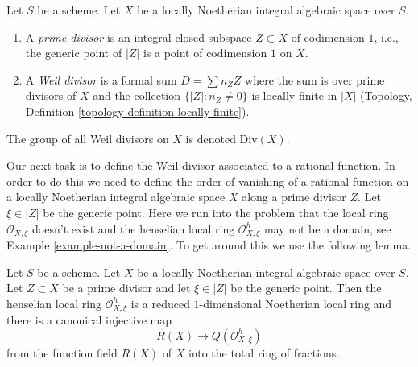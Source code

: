\begin{definition}
\label{definition-Weil-divisor}
Let $S$ be a scheme.
Let $X$ be a locally Noetherian integral algebraic space over $S$.
\begin{enumerate}
\item A {\it prime divisor} is an integral closed subspace $Z \subset X$
of codimension $1$, i.e., the generic point of $|Z|$ is a point
of codimension $1$ on $X$.
\item A {\it Weil divisor} is a formal sum $D = \sum n_Z Z$ where
the sum is over prime divisors of $X$ and the collection
$\{|Z| : n_Z \not = 0\}$ is locally finite in $|X|$
(Topology, Definition \ref{topology-definition-locally-finite}).
\end{enumerate}
The group of all Weil divisors on $X$ is denoted $\text{Div}(X)$.
\end{definition}

\noindent
Our next task is to define the Weil divisor associated to a rational
function. In order to do this we need to define the order of vanishing of a
rational function on a locally Noetherian integral algebraic space $X$
along a prime divisor $Z$. Let $\xi \in |Z|$ be the generic point.
Here we run into the problem that the local ring $\mathcal{O}_{X, \xi}$
doesn't exist and the henselian local ring $\mathcal{O}_{X, \xi}^h$
may not be a domain, see Example \ref{example-not-a-domain}.
To get around this we use the following lemma.

\begin{lemma}
\label{lemma-order-vanishing}
Let $S$ be a scheme. Let $X$ be a locally Noetherian integral algebraic space
over $S$. Let $Z \subset X$ be a prime divisor and let $\xi \in |Z|$ be
the generic point. Then the henselian local ring $\mathcal{O}_{X, \xi}^h$
is a reduced $1$-dimensional Noetherian local ring and
there is a canonical injective map
$$
R(X) \longrightarrow Q(\mathcal{O}_{X, \xi}^h)
$$
from the function field $R(X)$ of $X$ into the total ring of fractions.
\end{lemma}


